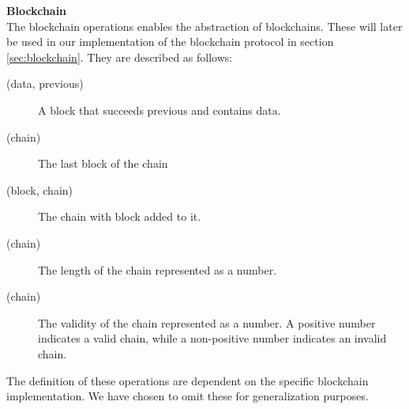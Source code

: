\FloatBarrier

\textbf{Blockchain}\\
The blockchain operations enables the abstraction of blockchains. These will later be used in our implementation of the blockchain protocol in section \ref{sec:blockchain}.
They are described as follows:

\begin{description}
    \item[(data, previous)]
        A block that succeeds previous and contains data.
    \item[(chain)]
        The last block of the chain
    \item[(block, chain)]
        The chain with block added to it.
    \item[(chain)]
        The length of the chain represented as a number.
    \item[(chain)]
        The validity of the chain represented as a number. A positive number indicates a valid chain, while a non-positive number indicates an invalid chain.
\end{description}

The definition of these operations are dependent on the specific blockchain implementation. We have chosen to omit these for generalization purposes.
